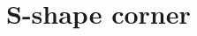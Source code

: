 \section{S-shape corner}
%
\begin{figure}[ht!]
    \centering
    \caption{}
    \label{fig:S-Shapel}
\end{figure}
%